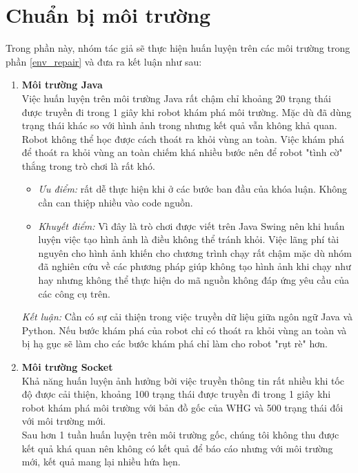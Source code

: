 \section{Chuẩn bị môi trường}
\label{env_repair_result}
Trong phần này, nhóm tác giả sẽ thực hiện huấn luyện trên các môi trường trong phần \ref{env_repair} và đưa ra kết luận như sau:
\begin{enumerate}
    \item \textbf{Môi trường Java}\\
    Việc huấn luyện trên môi trường Java rất chậm chỉ khoảng 20 trạng thái được truyền đi trong 1 giây khi robot khám phá môi trường. Mặc dù đã dùng trạng thái khác so với hình ảnh trong \cite{WHG_yasyf} nhưng kết quả vẫn không khả quan. Robot không thể học được cách thoát ra khỏi vùng an toàn. Việc khám phá để thoát ra khỏi vùng an toàn chiếm khá nhiều bước nên để robot "tình cờ" thắng trong trò chơi là rất khó.
    \begin{itemize}
        \item \textit{Ưu điểm:} rất dễ thực hiện khi ở các bước ban đầu của khóa luận. Không cần can thiệp nhiều vào code nguồn.
        \item \textit{Khuyết điểm:} Vì đây là trò chơi được viết trên Java Swing nên khi huấn luyện việc tạo hình ảnh là điều không thể tránh khỏi. Việc lãng phí tài nguyên cho hình ảnh khiến cho chương trình chạy rất chậm mặc dù nhóm đã nghiên cứu về các phương pháp giúp không tạo hình ảnh khi chạy như \cite{ghostawt} hay \cite{headlessjavase} nhưng không thể thực hiện
        do mã nguồn không đáp ứng yêu cầu của các công cụ trên.
    \end{itemize}
    \textit{Kết luận:} Cần có sự cải thiện trong việc truyền dữ liệu giữa ngôn ngữ Java và Python. Nếu bước khám phá của robot chỉ có thoát ra khỏi vùng an toàn và bị hạ gục sẽ làm cho các bước khám phá chỉ làm cho robot "rụt rè" hơn. 
    \item \textbf{Môi trường Socket}\\
    Khả năng huấn luyện ảnh hưởng bởi việc truyền thông tin rất nhiều khi tốc độ được cải thiện, khoảng 100 trạng thái được truyền đi trong 1 giây khi robot khám phá môi trường với bản đồ gốc của WHG và 500 trạng thái đối với môi trường mới.\\
    Sau hơn 1 tuần huấn luyện trên môi trường gốc, chúng tôi không thu được kết quả khá quan nên không có kết quả để báo cáo nhưng với môi trường mới, kết quả mang lại nhiều hứa hẹn.\\
    \\

\end{enumerate}
